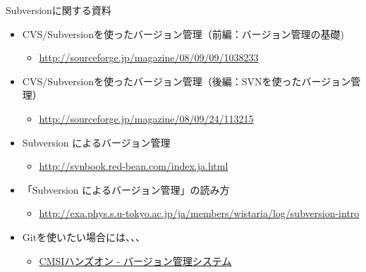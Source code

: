 \documentclass[10pt,dvipdfmx]{beamer}
\begin{document}
\begin{frame}[t,fragile]{Subversionに関する資料}
  \begin{itemize}
  \item CVS/Subversionを使ったバージョン管理（前編：バージョン管理の基礎)
    \begin{itemize}
    \item \url{http://sourceforge.jp/magazine/08/09/09/1038233}
    \end{itemize}
  \item CVS/Subversionを使ったバージョン管理（後編：SVNを使ったバージョン管理）
    \begin{itemize}
      \item \url{http://sourceforge.jp/magazine/08/09/24/113215}
    \end{itemize}
  \item Subversion によるバージョン管理
    \begin{itemize}
      \item \url{http://svnbook.red-bean.com/index.ja.html}
    \end{itemize}
  \item 「Subversion によるバージョン管理」の読み方
    \begin{itemize}
      \item \url{http://exa.phys.s.u-tokyo.ac.jp/ja/members/wistaria/log/subversion-intro}
    \end{itemize}
  \item Gitを使いたい場合には、、、
    \begin{itemize}
      \item \href{http://www.cms-initiative.jp/ja/research-support/develop-support/how-to-publish/develop-apps/dt0l33/manage-version}{CMSIハンズオン - バージョン管理システム}
    \end{itemize}
  \end{itemize}
\end{frame}
\end{document}
